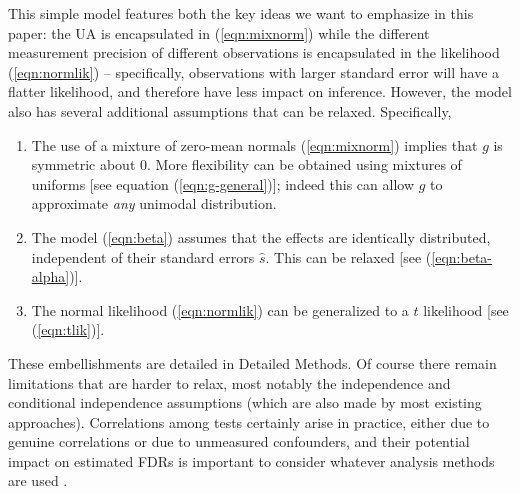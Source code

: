 \documentclass[11pt]{article}
\def\shat{\hat{s}}
\begin{document}
This simple model features both the key ideas we want to emphasize in this paper: the UA is encapsulated in (\ref{eqn:mixnorm}) while
the different measurement precision of different observations is encapsulated in the likelihood (\ref{eqn:normlik}) -- specifically, observations
with larger standard error will have a flatter likelihood, and therefore have less impact on inference.
However, the model also has several additional assumptions that can be relaxed. Specifically,
\begin{enumerate}
\item  The use of a mixture of zero-mean normals (\ref{eqn:mixnorm}) implies that $g$ is symmetric about 0.
More flexibility can be obtained using mixtures of uniforms [see equation (\ref{eqn:g-general})]; indeed this 
can allow $g$ to approximate {\it any} unimodal distribution. 
\item The model (\ref{eqn:beta}) assumes that the effects are identically distributed, independent of their standard errors $\shat$.
This can be relaxed [see (\ref{eqn:beta-alpha})].
\item The normal likelihood (\ref{eqn:normlik}) can be generalized to a $t$ likelihood [see (\ref{eqn:tlik})].
\end{enumerate}
These embellishments are detailed in Detailed Methods.
Of course there remain limitations that are harder to relax, most notably the independence and conditional independence assumptions
(which are also made by most existing approaches). Correlations among tests certainly arise in practice, either due to genuine correlations 
or due to unmeasured confounders, and their potential impact on estimated FDRs is important to consider
whatever analysis methods are used \cite{efron2007correlation,leek:2007}.
\end{document}
